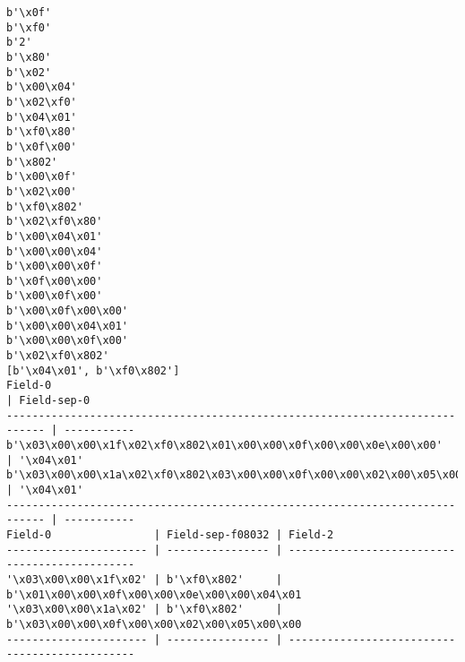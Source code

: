 \begin{verbatim}
b'\x0f'
b'\xf0'
b'2'
b'\x80'
b'\x02'
b'\x00\x04'
b'\x02\xf0'
b'\x04\x01'
b'\xf0\x80'
b'\x0f\x00'
b'\x802'
b'\x00\x0f'
b'\x02\x00'
b'\xf0\x802'
b'\x02\xf0\x80'
b'\x00\x04\x01'
b'\x00\x00\x04'
b'\x00\x00\x0f'
b'\x0f\x00\x00'
b'\x00\x0f\x00'
b'\x00\x0f\x00\x00'
b'\x00\x00\x04\x01'
b'\x00\x00\x0f\x00'
b'\x02\xf0\x802'
[b'\x04\x01', b'\xf0\x802']
Field-0                                                                      | Field-sep-0
---------------------------------------------------------------------------- | -----------
b'\x03\x00\x00\x1f\x02\xf0\x802\x01\x00\x00\x0f\x00\x00\x0e\x00\x00'         | '\x04\x01' 
b'\x03\x00\x00\x1a\x02\xf0\x802\x03\x00\x00\x0f\x00\x00\x02\x00\x05\x00\x00' | '\x04\x01' 
---------------------------------------------------------------------------- | -----------
Field-0                | Field-sep-f08032 | Field-2                                       
---------------------- | ---------------- | ----------------------------------------------
'\x03\x00\x00\x1f\x02' | b'\xf0\x802'     | b'\x01\x00\x00\x0f\x00\x00\x0e\x00\x00\x04\x01
'\x03\x00\x00\x1a\x02' | b'\xf0\x802'     | b'\x03\x00\x00\x0f\x00\x00\x02\x00\x05\x00\x00
---------------------- | ---------------- | ----------------------------------------------
\end{verbatim}
